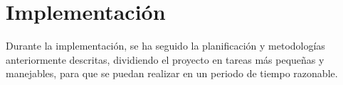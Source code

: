 \chapter{Implementación}
Durante la implementación, se ha seguido la planificación y metodologías anteriormente
descritas, dividiendo el proyecto en tareas más pequeñas y manejables, para que se puedan
realizar en un periodo de tiempo razonable.


